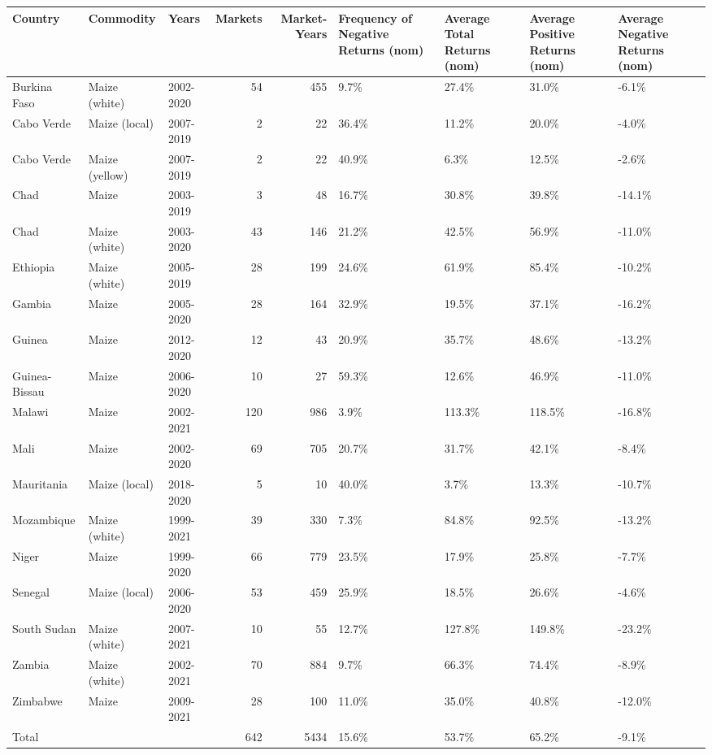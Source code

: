 \begin{table}[ht]
\centering
\begin{tabular}{lllrrllll}
  \hline
Country & Commodity & Years & Markets & Market-Years & Frequency of Negative Returns (nom) & Average Total Returns (nom) & Average Positive Returns (nom) & Average Negative Returns (nom) \\ 
  \hline
Burkina Faso & Maize (white) & 2002-2020 &  54 & 455 & 9.7\% & 27.4\% & 31.0\% & -6.1\% \\ 
  Cabo Verde & Maize (local) & 2007-2019 &   2 &  22 & 36.4\% & 11.2\% & 20.0\% & -4.0\% \\ 
  Cabo Verde & Maize (yellow) & 2007-2019 &   2 &  22 & 40.9\% & 6.3\% & 12.5\% & -2.6\% \\ 
  Chad & Maize & 2003-2019 &   3 &  48 & 16.7\% & 30.8\% & 39.8\% & -14.1\% \\ 
  Chad & Maize (white) & 2003-2020 &  43 & 146 & 21.2\% & 42.5\% & 56.9\% & -11.0\% \\ 
  Ethiopia & Maize (white) & 2005-2019 &  28 & 199 & 24.6\% & 61.9\% & 85.4\% & -10.2\% \\ 
  Gambia & Maize & 2005-2020 &  28 & 164 & 32.9\% & 19.5\% & 37.1\% & -16.2\% \\ 
  Guinea & Maize & 2012-2020 &  12 &  43 & 20.9\% & 35.7\% & 48.6\% & -13.2\% \\ 
  Guinea-Bissau & Maize & 2006-2020 &  10 &  27 & 59.3\% & 12.6\% & 46.9\% & -11.0\% \\ 
  Malawi & Maize & 2002-2021 & 120 & 986 & 3.9\% & 113.3\% & 118.5\% & -16.8\% \\ 
  Mali & Maize & 2002-2020 &  69 & 705 & 20.7\% & 31.7\% & 42.1\% & -8.4\% \\ 
  Mauritania & Maize (local) & 2018-2020 &   5 &  10 & 40.0\% & 3.7\% & 13.3\% & -10.7\% \\ 
  Mozambique & Maize (white) & 1999-2021 &  39 & 330 & 7.3\% & 84.8\% & 92.5\% & -13.2\% \\ 
  Niger & Maize & 1999-2020 &  66 & 779 & 23.5\% & 17.9\% & 25.8\% & -7.7\% \\ 
  Senegal & Maize (local) & 2006-2020 &  53 & 459 & 25.9\% & 18.5\% & 26.6\% & -4.6\% \\ 
  South Sudan & Maize (white) & 2007-2021 &  10 &  55 & 12.7\% & 127.8\% & 149.8\% & -23.2\% \\ 
  Zambia & Maize (white) & 2002-2021 &  70 & 884 & 9.7\% & 66.3\% & 74.4\% & -8.9\% \\ 
  Zimbabwe & Maize & 2009-2021 &  28 & 100 & 11.0\% & 35.0\% & 40.8\% & -12.0\% \\ 
  Total &  &  & 642 & 5434 & 15.6\% & 53.7\% & 65.2\% & -9.1\% \\ 
   \hline
\end{tabular}
\end{table}
